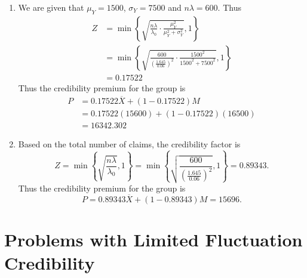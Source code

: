 \documentclass[notoc,notitlepage]{tufte-book}
\begin{document}
\begin{solution}
  \begin{enumerate}
    \item We are given that $\mu_Y = 1500$, $\sigma_Y = 7500$ and $n \lambda =
      600$. Thus
      \begin{align*}
        Z &= \min \left\{ \sqrt{\frac{n\lambda}{\lambda_0} \cdot
          \frac{\mu^2_Y}{\mu^2_Y + \sigma^2_Y}}, 1 \right\} \\
          &= \min \left\{ \sqrt{\frac{600}{\left(\frac{1.645}{0.06}\right)^2}
          \cdot \frac{1500^2}{1500^2 + 7500^2}}, 1 \right\} \\
          &= 0.17522
      \end{align*}
      Thus the credibility premium for the group is
      \begin{align*}
        P &= 0.17522 \overline{X} + (1-0.17522)M \\
          &= 0.17522 (15600) + (1-0.17522)(16500) \\
          &= 16342.302
      \end{align*}

    \item Based on the total number of claims, the credibility factor is
      \begin{equation*}
        Z = \min \left\{ \sqrt{\frac{n\lambda}{\lambda_0}}, 1 \right\}
        = \min \left\{ \sqrt{\frac{600}{\left( \frac{1.645}{0.06} \right)^2}}, 1
        \right\}
        = 0.89343.
      \end{equation*}
      Thus the credibility premium for the group is
      \begin{equation*}
        P = 0.89343 \overline{X} + (1-0.89343) M = 15696.
      \end{equation*}
  \end{enumerate}
\end{solution}


\section{Problems with Limited Fluctuation Credibility}%
\label{sec:problems_with_limited_fluctuation_credibility}
\end{document}
